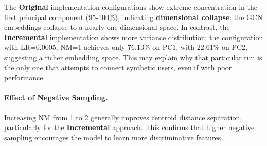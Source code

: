 The \textcolor{drawred}{\textbf{Original}} implementation configurations show extreme concentration in the first principal component (95-100\%), indicating \textbf{dimensional collapse}: the GCN embeddings collapse to a nearly one-dimensional space. In contrast, the \textcolor{drawblue}{\textbf{Incremental}} implementation shows more variance distribution: the configuration with LR=0.0005, NM=1 achieves only 76.13\% on PC1, with 22.61\% on PC2, suggesting a richer embedding space. This may explain why that particular run is the only one that attempts to connect synthetic users, even if with poor performance.


\paragraph{Effect of Negative Sampling.} Increasing NM from 1 to 2 generally improves centroid distance separation, particularly for the \textcolor{drawblue}{\textbf{Incremental}} approach. This confirms that higher negative sampling encourages the model to learn more discriminative features.




